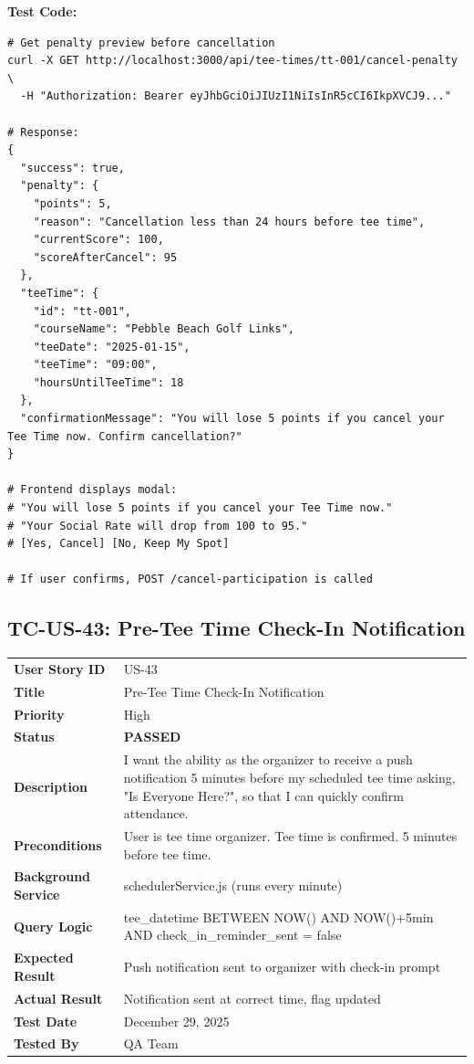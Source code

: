 \documentclass[11pt,a4paper]{article}
\newcommand{\passed}{\textcolor{pass}{\textbf{PASSED}}}
\begin{document}
\vspace{0.3cm}
\textbf{Test Code:}
\begin{lstlisting}
# Get penalty preview before cancellation
curl -X GET http://localhost:3000/api/tee-times/tt-001/cancel-penalty \
  -H "Authorization: Bearer eyJhbGciOiJIUzI1NiIsInR5cCI6IkpXVCJ9..."

# Response:
{
  "success": true,
  "penalty": {
    "points": 5,
    "reason": "Cancellation less than 24 hours before tee time",
    "currentScore": 100,
    "scoreAfterCancel": 95
  },
  "teeTime": {
    "id": "tt-001",
    "courseName": "Pebble Beach Golf Links",
    "teeDate": "2025-01-15",
    "teeTime": "09:00",
    "hoursUntilTeeTime": 18
  },
  "confirmationMessage": "You will lose 5 points if you cancel your Tee Time now. Confirm cancellation?"
}

# Frontend displays modal:
# "You will lose 5 points if you cancel your Tee Time now."
# "Your Social Rate will drop from 100 to 95."
# [Yes, Cancel] [No, Keep My Spot]

# If user confirms, POST /cancel-participation is called
\end{lstlisting}

\vspace{0.5cm}


\subsection{TC-US-43: Pre-Tee Time Check-In Notification}

\begin{tabularx}{\textwidth}{|p{3.2cm}|Y|}
\hline
{}
 \\
\hline
\textbf{User Story ID} & US-43 \\
\hline
\textbf{Title} & Pre-Tee Time Check-In Notification \\
\hline
\textbf{Priority} & High \\
\hline
\textbf{Status} & \passed \\
\hline
\textbf{Description} & I want the ability as the organizer to receive a push notification 5 minutes before my scheduled tee time asking, "Is Everyone Here?", so that I can quickly confirm attendance. \\
\hline
\textbf{Preconditions} & User is tee time organizer. Tee time is confirmed. 5 minutes before tee time. \\
\hline
\textbf{Background Service} & schedulerService.js (runs every minute) \\
\hline
\textbf{Query Logic} & tee\_datetime BETWEEN NOW() AND NOW()+5min AND check\_in\_reminder\_sent = false \\
\hline
\textbf{Expected Result} & Push notification sent to organizer with check-in prompt \\
\hline
\textbf{Actual Result} & Notification sent at correct time, flag updated \\
\hline
\textbf{Test Date} & December 29, 2025 \\
\hline
\textbf{Tested By} & QA Team \\
\hline
\end{tabularx}
\end{document}
